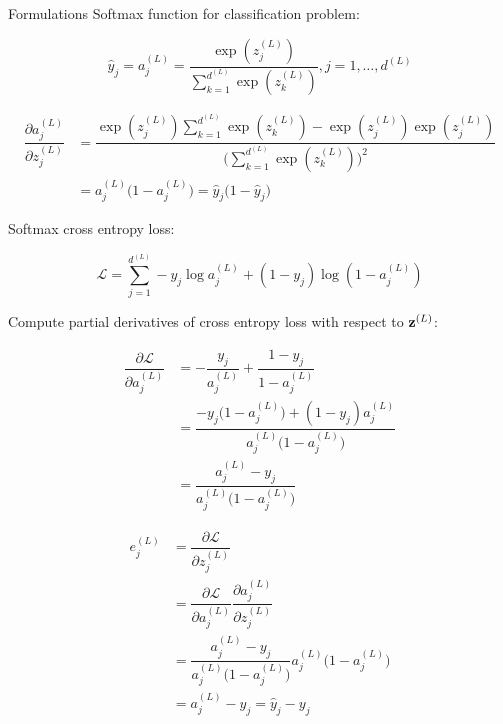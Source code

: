 \documentclass[10pt]{beamer}
\theoremstyle{remark}
\theoremstyle{definition}
\begin{document}
\begin{frame}[allowframebreaks]{Formulations}
	Softmax function for classification problem:

	\begin{equation}
		\hat{y}_j = a_j^{(L)}=\dfrac{\exp(z_j^{(L)})}{\sum_{k=1}^{d^{(L)}}\exp(z_k^{(L)})}, j=1,\dots, d^{(L)}
	\end{equation}

	\begin{equation}
		\begin{aligned}
			\dfrac{\partial a_j^{(L)}}{\partial z_j^{(L)}}&=\dfrac{\exp(z_j^{(L)})\sum_{k=1}^{d^{(L)}}\exp(z_k^{(L)}) - \exp(z_j^{(L)})\exp(z_j^{(L)})}{\Bigg(\sum_{k=1}^{d^{(L)}}\exp(z_k^{(L)})\Bigg)^2}\\&=a_j^{(L)}\Big(1- a_j^{(L)} \Big)=\hat{y}_j \Big(1 - \hat{y}_j\Big)
		\end{aligned}
	\end{equation}

	Softmax cross entropy loss:

	\begin{equation}
		\mathcal{L}=\sum_{j=1}^{d^{(L)}}-y_j \log a_j^{(L)}+(1-y_j)\log(1-a_j^{(L)})
	\end{equation}

	Compute partial derivatives of cross entropy loss with respect to $\bold{z}^{(L)}$:

	\begin{equation}
		\begin{aligned}
			\dfrac{\partial \mathcal{L}}{\partial a_j^{(L)}}&=-\dfrac{y_j}{a_j^{(L)}}+\dfrac{1-y_j}{1-a_j^{(L)}}\\&=\dfrac{-y_j\Big(1-a_j^{(L)}\Big)+(1-y_j)a_j^{(L)}}{a_j^{(L)}\Big(1-a_j^{(L)}\Big)}\\&=\dfrac{a_j^{(L)}-y_j}{a_j^{(L)}\Big(1-a_j^{(L)}\Big)}
		\end{aligned}
	\end{equation}

	\begin{equation}
		\begin{aligned}
			e_j^{(L)}&=\dfrac{\partial \mathcal{L}}{\partial z_j^{(L)}}\\&=\dfrac{\partial \mathcal{L}}{\partial a_j^{(L)}}\dfrac{\partial a_j^{(L)}}{\partial z_j^{(L)}}\\&=\dfrac{a_j^{(L)}-y_j}{a_j^{(L)}\Big(1-a_j^{(L)}\Big)}a_j^{(L)}\Big(1- a_j^{(L)} \Big)\\&=a_j^{(L)} - y_j =\hat{y}_j - y_j
		\end{aligned}
	\end{equation}


\end{frame}
\end{document}
